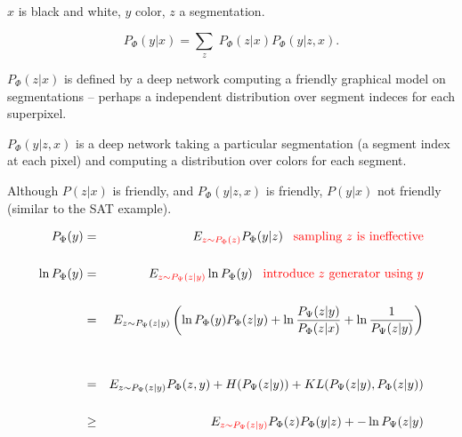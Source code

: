 {$x$ is black and white, $y$ color, $z$ a segmentation.

\vfill
$$P_\Phi(y|x) = \sum_z\;P_\Phi(z|x)P_\Phi(y|z,x).$$


$P_\Phi(z|x)$ is defined by a deep network computing a friendly graphical model on segmentations -- perhaps a independent distribution over segment
indeces for each superpixel.

\vfill
$P_\Phi(y|z,x)$ is a deep network taking a particular segmentation (a segment index at each pixel) and computing
a distribution over colors for each segment.

\vfill
Although $P(z|x)$ is friendly, and $P_\Phi(y|z,x)$ is friendly, $P(y|x)$ not friendly (similar to the SAT example).


\vfill

\begin{eqnarray*}
P_\Phi(y) & = & E_{\color{red} z \sim P_\Phi(z)}P_\Phi(y|z) \;\;\;\mbox{\color{red} sampling $z$ is ineffective}\\
\\
\ln P_\Phi(y) & = & E_{\color{red} z \sim P_\Psi(z|y)} \ln P_\Phi(y) \;\;\;\mbox{\color{red} introduce $z$ generator using $y$}\\
\\
 & = & E_{z \sim P_\Psi(z|y)} \left(\ln P_\Phi(y)P_\Phi(z|y) + \ln \frac{P_\Psi(z|y)}{P_\Phi(z|x)} + \ln\frac{1}{P_\Psi(z|y)}\right) \\
 \\
 \\
 & = & E_{z \sim P_\Psi(z|y)} P_\Phi(z,y) + H(P_\Psi(z|y)) + KL(P_\Psi(z|y),P_\Phi(z|y)) \\
 \\
 & \geq & E_{\color{red} z \sim P_\Psi(z|y)}P_\Phi(z)P_\Phi(y|z) + - \ln P_\Psi(z|y)
\end{eqnarray*}


}

